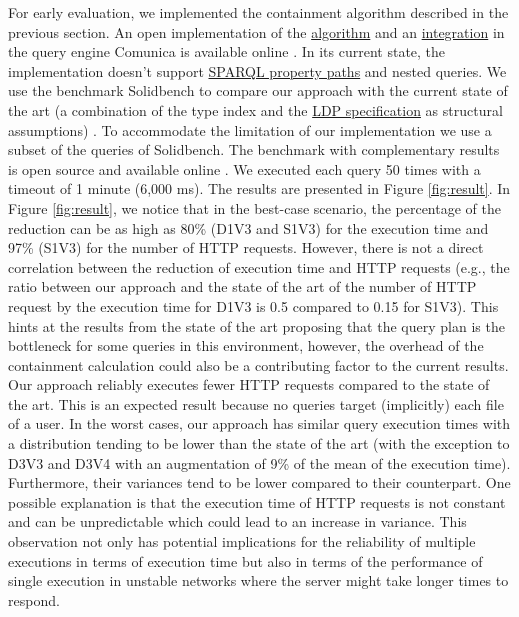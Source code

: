 For early evaluation, we implemented the containment algorithm described in the previous section.
An open implementation of the \href{https://github.com/constraintAutomaton/query-shape-detection}{algorithm} and an \href{https://github.com/constraintAutomaton/comunica-feature-link-traversal/tree/feature/shapeIndex}{integration} in the query engine Comunica \cite{taelman_iswc_resources_comunica_2018} is available online .
In its current state, the implementation doesn't support 
\href{https://www.w3.org/TR/sparql11-query/#propertypaths}{SPARQL property paths} and nested queries.
We use the benchmark Solidbench \cite{Taelman2023} to compare our approach with the current state of the art 
(a combination of the type index and the \href{https://www.w3.org/TR/ldp/}{LDP specification} as structural assumptions) \cite{Taelman2023}.
To accommodate the limitation of our implementation we use a subset of the queries of Solidbench.
The benchmark with complementary results is open source and available online .
We executed each query 50 times with a timeout of 1 minute (6,000 ms).
The results are presented in Figure \ref{fig:result}.
In Figure \ref{fig:result}, we notice that in the best-case scenario, the percentage of the reduction can be as high as 80\% (D1V3 and S1V3) for the execution time 
and 97\% (S1V3) for the number of HTTP requests.
However, there is not a direct correlation between the reduction of execution time and HTTP requests (e.g., the ratio 
between our approach and the state of the art of the number of HTTP request by the execution time for D1V3 is 0.5 compared to 0.15 for S1V3).
This hints at the results from the state of the art \cite{Taelman2023} proposing that the query plan is the bottleneck for some queries in this environment,
however, the overhead of the containment calculation could also be a contributing factor to the current results.
Our approach reliably executes fewer HTTP requests compared to the state of the art.
This is an expected result because no queries target (implicitly) each file of a user.
In the worst cases, our approach  has similar query execution times with a 
distribution tending to be lower than the state of the art (with the exception to D3V3 and D3V4 with an augmentation of 9\% of the mean of the execution time).
Furthermore, their variances tend to be lower compared to their counterpart. 
One possible explanation is that the execution time of HTTP requests is not constant and can be unpredictable \cite{hartig2016walking}
which could lead to an increase in variance.
This observation not only has potential implications for the reliability of multiple executions in terms of execution time
but also in terms of the performance of single execution in unstable networks where the server might take longer times to respond. 
